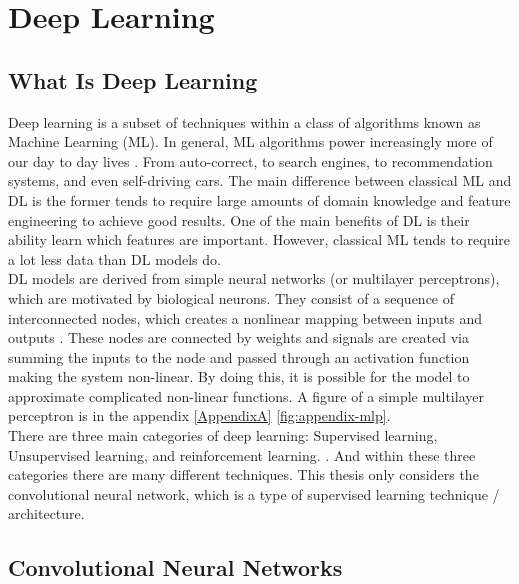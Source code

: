\section{Deep Learning}
\subsection{What Is Deep Learning}
Deep learning is a subset of techniques within a class of algorithms known as Machine Learning (ML). In general, ML algorithms power increasingly more of our day to day lives \cite{lecun2015deep}. From auto-correct, to search engines, to recommendation systems, and even self-driving cars. The main difference between classical ML and DL is the former tends to require large amounts of domain knowledge and feature engineering to achieve good results. One of the main benefits of DL is their ability learn which features are important. However, classical ML tends to require a lot less data than DL models do. \\

 DL models are derived from simple neural networks (or multilayer perceptrons), which are motivated by biological neurons. They consist of a sequence of interconnected nodes, which creates a nonlinear mapping between inputs and outputs \cite{gardner1998artificial}. These nodes are connected by weights and signals are created via summing the inputs to the node and passed through an activation function making the system non-linear. By doing this, it is possible for the model to approximate complicated non-linear functions. A figure of a simple multilayer perceptron is in the appendix \ref{AppendixA} \ref{fig:appendix-mlp}. \\
 
 There are three main categories of deep learning: Supervised learning, Unsupervised learning, and reinforcement learning. \cite{alzubaidi2021review}. And within these three categories there are many different techniques. This thesis only considers the convolutional neural network, which is a type of supervised learning technique / architecture. 

	
\subsection{Convolutional Neural Networks}
